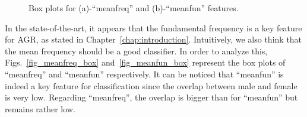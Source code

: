 \begin{figure}[htb]
	\hfill%
	\hfill%
	\hfill\null%
	\caption{Box plots for (a)-``meanfreq'' and (b)-``meanfun'' features.}
	\label{fig_mean_freq}
\end{figure}

In the state-of-the-art, it appears that the fundamental frequency is a key feature for AGR, as stated in Chapter~\ref{chap:introduction}. Intuitively, we also think that the mean frequency should be a good classifier. In order to analyze this, Figs.~\ref{fig_meanfreq_box} and~\ref{fig_meanfun_box} represent the box plots of ``meanfreq'' and ``meanfun'' respectively. 
It can be noticed that ``meanfun'' is indeed a key feature for classification since the overlap between male and female is very low. Regarding ``meanfreq'', the overlap is bigger than for ``meanfun'' but remains rather low. 

